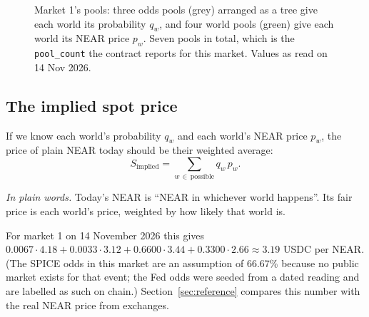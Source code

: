 \documentclass[11pt,a4paper]{article}
\newcommand{\wSC}{\textsf{SHIPS$\cdot$CUTS}}
\newcommand{\wDC}{\textsf{DELAYED$\cdot$CUTS}}
\newcommand{\wSH}{\textsf{SHIPS$\cdot$HOLDS}}
\newcommand{\wDH}{\textsf{DELAYED$\cdot$HOLDS}}
\newcommand{\code}[1]{\texttt{\small #1}}
\newcommand{\inwords}[1]{\par\noindent\colorbox{note}{\parbox{\dimexpr\linewidth-2\fboxsep}{\small\textit{In plain words.} #1}}\par}
\begin{document}
\begin{figure}[t]
\centering
{}
\caption{Market 1's pools: three odds pools (grey) arranged as a tree give each world its probability $q_w$, and four
world pools (green) give each world its NEAR price $p_w$. Seven pools in total, which is the \code{pool\_count} the
contract reports for this market. Values as read on 14 Nov 2026.}
\label{fig:pools}
\end{figure}

\subsection{The implied spot price}

If we know each world's probability $q_w$ and each world's NEAR price $p_w$, the price of plain NEAR today should be
their weighted average:
\begin{equation}
  S_{\text{implied}} = \sum_{w\,\in\,\text{possible}} q_w \, p_w .
  \label{eq:implied}
\end{equation}
\inwords{Today's NEAR is ``NEAR in whichever world happens''. Its fair price is each world's price, weighted by how
likely that world is.}
For market 1 on 14 November 2026 this gives
$0.0067\cdot4.18 + 0.0033\cdot3.12 + 0.6600\cdot3.44 + 0.3300\cdot2.66 \approx 3.19$ USDC per NEAR. (The SPICE odds
in this market are an assumption of 66.67\% because no public market exists for that event; the Fed odds were seeded
from a dated reading and are labelled as such on chain.) Section~\ref{sec:reference} compares this number with
the real NEAR price from exchanges.
\end{document}
